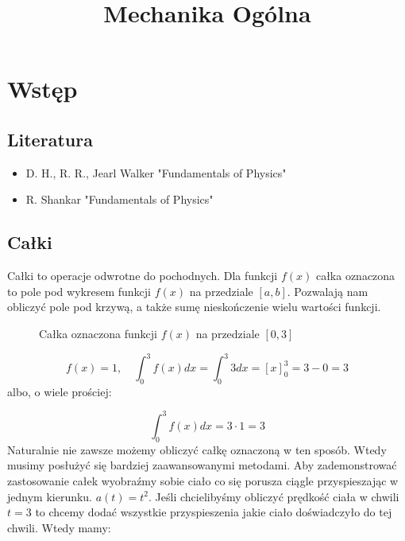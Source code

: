 \documentclass{../notatki}
\title{Mechanika Ogólna}
\begin{document}
\tableofcontents

\setcounter{section}{-1}

\section{Wstęp}

\subsection{Literatura}

\begin{itemize}
  \item D. H., R. R., Jearl Walker "Fundamentals of Physics"
  \item R. Shankar "Fundamentals of Physics"
\end{itemize}

\subsection{Całki}

Całki to operacje odwrotne do pochodnych. Dla funkcji $f(x)$ całka oznaczona
to pole pod wykresem funkcji $f(x)$ na przedziale $[a, b]$. Pozwalają nam
obliczyć pole pod krzywą, a także sumę nieskończenie wielu wartości funkcji.

\begin{figure*}[ht]
  \centering
  \caption{Całka oznaczona funkcji $f(x)$ na przedziale $[0, 3]$}
\end{figure*}

$$
f(x) = 1, \quad \int_0^3 f(x) dx = \int_0^3 3 dx =\left[x\right]^3_0 = 3 - 0 = 3
$$
albo, o wiele prościej:

$$
\int_0^3 f(x) dx = 3 \cdot 1 = 3
$$
Naturalnie nie zawsze możemy obliczyć całkę oznaczoną w ten sposób. Wtedy
musimy posłużyć się bardziej zaawansowanymi metodami.
Aby zademonstrować zastosowanie całek wyobraźmy sobie ciało co się porusza
ciągle przyspieszając w jednym kierunku. $a(t) = t^2$. Jeśli chcielibyśmy
obliczyć prędkość ciała w chwili $t = 3$ to chcemy dodać wszystkie
przyspieszenia
jakie ciało doświadczyło do tej chwili. Wtedy mamy:
\end{document}
